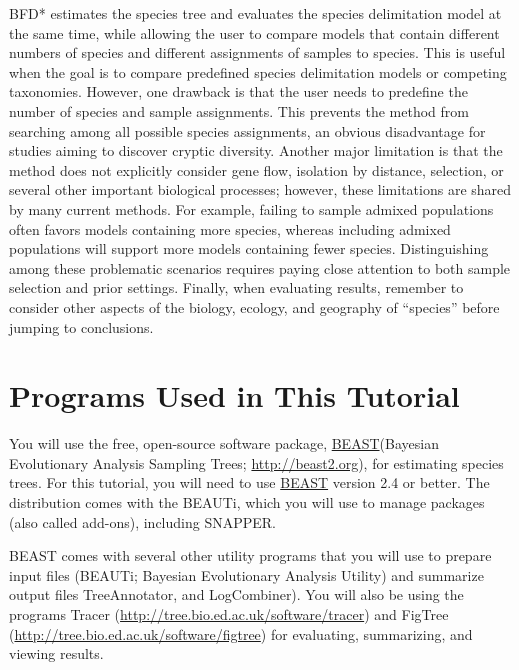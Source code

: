 \documentclass{article}
\newcommand{\program}[1]{#1\xspace}
\newcommand{\beast}{\href{http://beast2.org}{\program{BEAST}}\xspace}
\begin{document}
BFD* estimates the species tree and evaluates the species delimitation model at the same time, while allowing the user to compare models that contain different numbers of species and different assignments of samples to species. This is useful when the goal is to compare predefined species delimitation models or competing taxonomies. However, one drawback is that the user needs to predefine the number of species and sample assignments. This prevents the method from searching among all possible species assignments, an obvious disadvantage for studies aiming to discover cryptic diversity. Another major limitation is that the method does not explicitly consider gene flow, isolation by distance, selection, or several other important biological processes; however, these limitations are shared by many current methods. For example, failing to sample admixed populations often favors models containing more species, whereas including admixed populations will support more models containing fewer species. Distinguishing among these problematic scenarios requires paying close attention to both sample selection and prior settings. Finally, when evaluating results, remember to consider other aspects of the biology, ecology, and geography of ``species'' before jumping to conclusions.

\section{Programs Used in This Tutorial}
You will use the free, open-source software package, \beast (Bayesian
Evolutionary Analysis Sampling Trees;
\href{http://beast2.org}{\url{http://beast2.org}}), for
estimating species trees.
For this tutorial, you will need to use \beast version 2.4 or better. 
The distribution comes with the \program{BEAUTi}, which you will use to manage packages (also called add-ons), including \program{SNAPPER}.

\program{BEAST} comes with several other utility programs that you will use to prepare 
input files (\program{BEAUTi}; Bayesian Evolutionary Analysis
Utility) and summarize output files \program{TreeAnnotator}, and \program{LogCombiner}).
You will also be using the programs \program{Tracer}
(\href{http://tree.bio.ed.ac.uk/software/tracer}{\url{http://tree.bio.ed.ac.uk/software/tracer}})
and \program{FigTree}
(\href{http://tree.bio.ed.ac.uk/software/figtree}{\url{http://tree.bio.ed.ac.uk/software/figtree}})
for evaluating, summarizing, and viewing results.
\end{document}
